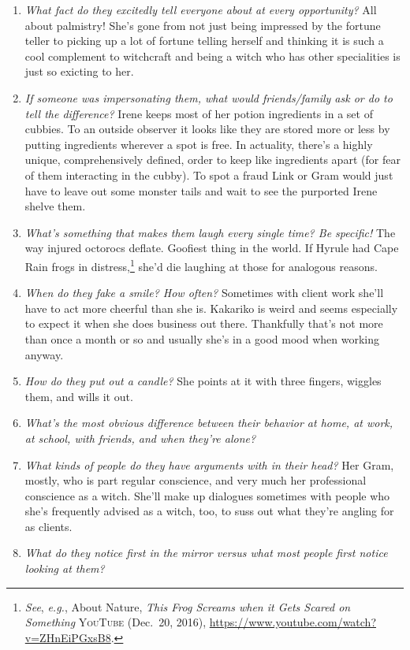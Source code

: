 \begin{enumerate}
    \item \textit{What fact do they excitedly tell everyone about at every opportunity?}
      All about palmistry! She's gone from not just being impressed by the fortune teller to picking up a lot of fortune telling herself and thinking it is such a cool complement to witchcraft and being a witch who has other specialities is just so exicting to her.
    \item \textit{If someone was impersonating them, what would friends/family ask or do to tell the difference?}
      Irene keeps most of her potion ingredients in a set of cubbies. To an outside observer it looks like they are stored more or less by putting ingredients wherever a spot is free. In actuality, there's a highly unique, comprehensively defined, order to keep like ingredients apart (for fear of them interacting in the cubby). To spot a fraud Link or Gram would just have to leave out some monster tails and wait to see the purported Irene shelve them.
    \item \textit{What’s something that makes them laugh every single time? Be specific!}
      The way injured octorocs deflate. Goofiest thing in the world. If Hyrule had Cape Rain frogs in distress,\footnote{\textit{See}, \textit{e.g.}, About Nature, \textit{This Frog Screams when it Gets Scared on Something} \textsc{YouTube} (Dec.~20, 2016), \url{https://www.youtube.com/watch?v=ZHnEiPGxsB8}.} she'd die laughing at those for analogous reasons.
    \item \textit{When do they fake a smile? How often?}
      Sometimes with client work she'll have to act more cheerful than she is. Kakariko is weird and seems especially to expect it when she does business out there. Thankfully that's not more than once a month or so and usually she's in a good mood when working anyway.
    \item \textit{How do they put out a candle?}
      She points at it with three fingers, wiggles them, and wills it out.
    \item \textit{What’s the most obvious difference between their behavior at home, at work, at school, with friends, and when they’re alone?}
    \item \textit{What kinds of people do they have arguments with in their head?}
      Her Gram, mostly, who is part regular conscience, and very much her professional conscience as a witch. She'll make up dialogues sometimes with people who she's frequently advised as a witch, too, to suss out what they're angling for as clients.
    \item \textit{What do they notice first in the mirror versus what most people first notice looking at them?}

\end{enumerate}
